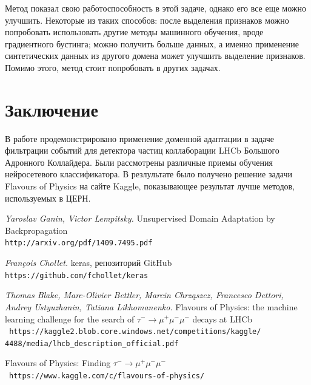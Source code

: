 \documentclass[14pt]{extarticle}
\begin{document}
Метод показал свою работоспособность в этой задаче, однако его все еще можно улучшить. Некоторые из таких способов: после выделения признаков можно попробовать использовать другие методы машинного обучения, вроде градиентного бустинга; можно получить больше данных, а именно применение синтетических данных из другого домена может улучшить выделение признаков. Помимо этого, метод стоит попробовать в других задачах.

\newpage
\section*{Заключение}

В работе продемонстрировано применение доменной адаптации в задаче фильтрации событий для детектора частиц коллаборации LHCb Большого Адронного Коллайдера. Были рассмотрены различные приемы обучения нейросетевого классификатора. В резлультате было получено решение задачи Flavours of Physics на сайте Kaggle, показывающее результат лучше методов, используемых в ЦЕРН.

\newpage
{}

\begin{thebibliography}{3}  

\textit{Yaroslav Ganin, Victor Lempitsky.} Unsupervised Domain Adaptation by Backpropagation \\ \texttt{http://arxiv.org/pdf/1409.7495.pdf}

\textit{François Chollet.} keras, репозиторий GitHub \\ \texttt{https://github.com/fchollet/keras}

\textit{Thomas Blake, Marc-Olivier Bettler, Marcin Chrząszcz, Francesco Dettori, Andrey Ustyuzhanin, Tatiana Likhomanenko.} Flavours of Physics: the machine learning challenge for the search of $\tau^-\rightarrow\mu^+ \mu^- \mu^-$ decays at LHCb \\ \texttt{
	https://kaggle2.blob.core.windows.net/competitions/kaggle/\\4488/media/lhcb\_description\_official.pdf
	}
	
 Flavours of Physics: Finding $\tau^-\rightarrow\mu^+ \mu^- \mu^-$ \\ \texttt{https://www.kaggle.com/c/flavours-of-physics/}

\end{thebibliography}

\label{page:last}
\end{document}
